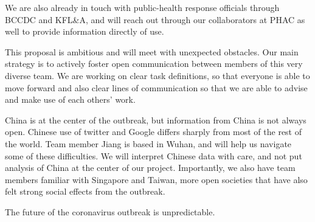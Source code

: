 We are also already in touch with public-health response officials through BCCDC and KFL\&A, and will reach out through our collaborators at PHAC as well to provide information directly of use.


This proposal is ambitious and will meet with unexpected obstacles. Our main strategy is to actively foster open communication between members of this very diverse team. We are working on clear task definitions, so that everyone is able to move forward and also clear lines of communication so that we are able to advise and make use of each others' work.

China is at the center of the outbreak, but information from China is not always open. Chinese use of twitter and Google differs sharply from most of the rest of the world. Team member Jiang is based in Wuhan, and will help us navigate some of these difficulties. We will interpret Chinese data with care, and not put analysis of China at the center of our project. Importantly, we also have team members familiar with Singapore and Taiwan, more open societies that have also felt strong social effects from the outbreak.

The future of the coronavirus outbreak is unpredictable. 
